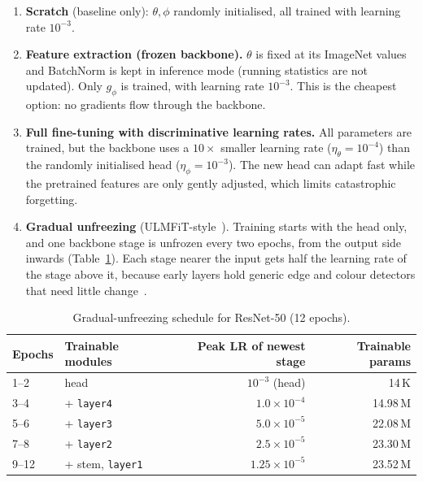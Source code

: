 \begin{enumerate}
  \item \textbf{Scratch} (baseline only): $\theta,\phi$ randomly initialised, all trained with learning rate
        $10^{-3}$.
  \item \textbf{Feature extraction (frozen backbone).} $\theta$ is fixed at its ImageNet values and BatchNorm is
        kept in inference mode (running statistics are not updated). Only $g_\phi$ is trained, with learning
        rate $10^{-3}$. This is the cheapest option: no gradients flow through the backbone.
  \item \textbf{Full fine-tuning with discriminative learning rates.} All parameters are trained, but the
        backbone uses a $10\times$ smaller learning rate ($\eta_\theta = 10^{-4}$) than the randomly initialised
        head ($\eta_\phi = 10^{-3}$). The new head can adapt fast while the pretrained features are only
        gently adjusted, which limits catastrophic forgetting.
  \item \textbf{Gradual unfreezing} (ULMFiT-style~\cite{ulmfit}). Training starts with the head only, and one
        backbone stage is unfrozen every two epochs, from the output side inwards (Table~\ref{tab:gradual}).
        Each stage nearer the input gets half the learning rate of the stage above it, because early layers
        hold generic edge and colour detectors that need little change~\cite{yosinski2014}.
\end{enumerate}

\begin{table}[H]
\centering
\caption{Gradual-unfreezing schedule for ResNet-50 (12 epochs).}
\label{tab:gradual}
\begin{tabular}{llrr}
\toprule
Epochs & Trainable modules & Peak LR of newest stage & Trainable params \\
\midrule
1--2 & head & $10^{-3}$ (head) & 14\,K \\
3--4 & + \texttt{layer4} & $1.0\times10^{-4}$ & 14.98\,M \\
5--6 & + \texttt{layer3} & $5.0\times10^{-5}$ & 22.08\,M \\
7--8 & + \texttt{layer2} & $2.5\times10^{-5}$ & 23.30\,M \\
9--12 & + stem, \texttt{layer1} & $1.25\times10^{-5}$ & 23.52\,M \\
\bottomrule
\end{tabular}
\end{table}

